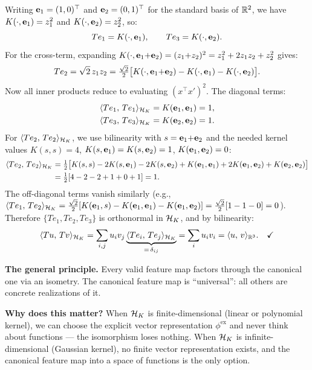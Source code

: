 \begin{notechapter}
\begin{insightbox}
Writing $\mathbf{e}_1 = (1,0)^\top$ and
$\mathbf{e}_2 = (0,1)^\top$ for the standard basis of
$\mathbb{R}^2$, we have
$K(\cdot, \mathbf{e}_1) = z_1^2$ and
$K(\cdot, \mathbf{e}_2) = z_2^2$, so:
\[
Te_1 = K(\cdot, \mathbf{e}_1), \qquad
Te_3 = K(\cdot, \mathbf{e}_2).
\]
For the cross-term, expanding
$K(\cdot, \mathbf{e}_1{+}\mathbf{e}_2) = (z_1{+}z_2)^2
= z_1^2 + 2z_1 z_2 + z_2^2$ gives:
\[
Te_2 = \sqrt{2}\,z_1 z_2
= \tfrac{\sqrt{2}}{2}\bigl[
K(\cdot, \mathbf{e}_1{+}\mathbf{e}_2)
- K(\cdot, \mathbf{e}_1) - K(\cdot, \mathbf{e}_2)\bigr].
\]
Now all inner products reduce to evaluating
$(x^\top x')^2$. The diagonal terms:
\begin{align*}
\langle Te_1,\, Te_1 \rangle_{\mathcal{H}_K}
&= K(\mathbf{e}_1, \mathbf{e}_1) = 1, \\
\langle Te_3,\, Te_3 \rangle_{\mathcal{H}_K}
&= K(\mathbf{e}_2, \mathbf{e}_2) = 1.
\end{align*}
For $\langle Te_2,\, Te_2 \rangle_{\mathcal{H}_K}$, we use bilinearity
with $s = \mathbf{e}_1{+}\mathbf{e}_2$ and the needed
kernel values $K(s,s) = 4$,
$K(s,\mathbf{e}_1) = K(s,\mathbf{e}_2) = 1$,
$K(\mathbf{e}_1,\mathbf{e}_2) = 0$:
\begin{align*}
\langle Te_2,\, Te_2 \rangle_{\mathcal{H}_K}
&= \tfrac{1}{2}\bigl[
  K(s,s) - 2K(s,\mathbf{e}_1) - 2K(s,\mathbf{e}_2)
  + K(\mathbf{e}_1,\mathbf{e}_1)
  + 2K(\mathbf{e}_1,\mathbf{e}_2)
  + K(\mathbf{e}_2,\mathbf{e}_2)
\bigr] \\
&= \tfrac{1}{2}[4 - 2 - 2 + 1 + 0 + 1] = 1.
\end{align*}
The off-diagonal terms vanish similarly (e.g.,
$\langle Te_1,\, Te_2 \rangle_{\mathcal{H}_K}
= \frac{\sqrt{2}}{2}[K(\mathbf{e}_1, s)
- K(\mathbf{e}_1, \mathbf{e}_1)
- K(\mathbf{e}_1, \mathbf{e}_2)]
= \frac{\sqrt{2}}{2}[1 - 1 - 0] = 0$).
Therefore $\{Te_1, Te_2, Te_3\}$ is orthonormal in
$\mathcal{H}_K$, and by bilinearity:
\[
\inner{Tu}{Tv}_{\hk}
= \sum_{i,j} u_i v_j
  \underbrace{\inner{Te_i}{Te_j}_{\hk}}_{%
    =\,\delta_{ij}}
= \sum_i u_i v_i
= \inner{u}{v}_{\R^3}.
\quad\checkmark
\]
\end{insightbox}

\begin{insightbox}
\textbf{The general principle.} Every valid feature
map factors through the canonical one via an isometry.
The canonical feature map is ``universal'': all others
are concrete realizations of it.

\textbf{Why does this matter?} When $\mathcal{H}_K$ is
finite-dimensional (linear or polynomial kernel), we
can choose the explicit vector representation
$\phi^{\mathrm{ex}}$ and never think about functions
--- the isomorphism loses nothing. When $\mathcal{H}_K$ is
infinite-dimensional (Gaussian kernel), no finite
vector representation exists, and the canonical
feature map into a space of functions is the only
option.
\end{insightbox}


\end{notechapter}
